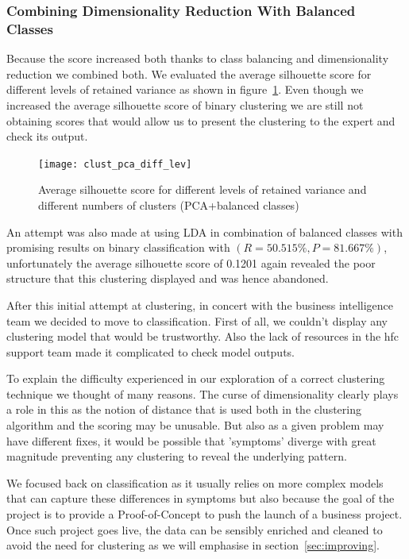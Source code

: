 \subsubsection{Combining Dimensionality Reduction With Balanced Classes}
Because the score increased both thanks to class balancing and dimensionality reduction we combined both. We evaluated the average silhouette score for different levels of retained variance as shown in figure~\ref{clust_pca_diff_lev}. Even though we increased the average silhouette score of binary clustering we are still not obtaining scores that would allow us to present the clustering to the expert and check its output. 

\begin{figure}[ht]
    \begin{center}
    \texttt{[image: clust\_pca\_diff\_lev]}
    \end{center}
    \caption{Average silhouette score for different levels of retained variance and different numbers of clusters (PCA+balanced classes)}
    \label{clust_pca_diff_lev}
\end{figure}

An attempt was also made at using LDA in combination of balanced classes with promising results on binary classification with $(R=50.515\%,P=81.667\%)$, unfortunately the average silhouette score of 0.1201 again revealed the poor structure that this clustering displayed and was hence abandoned. 

\vspace{1\baselineskip}
After this initial attempt at clustering, in concert with the business intelligence team we decided to move to classification. First of all, we couldn't display any clustering model that would be trustworthy. Also the lack of resources in the \acrshort{hfc} support team made it complicated to check model outputs. 

To explain the difficulty experienced in our exploration of a correct clustering technique we thought of many reasons. The curse of dimensionality clearly plays a role in this as the notion of distance that is used both in the clustering algorithm and the scoring may be unusable. But also as a given problem may have different fixes, it would be possible that 'symptoms' diverge with great magnitude preventing any clustering to reveal the underlying pattern. 

\vspace{1\baselineskip}
We focused back on classification as it usually relies on more complex models that can capture these differences in symptoms but also because the goal of the project is to provide a Proof-of-Concept to push the launch of a business project. Once such project goes live, the data can be sensibly enriched and cleaned to avoid the need for clustering as we will emphasise in section~\ref{sec:improving}. 

